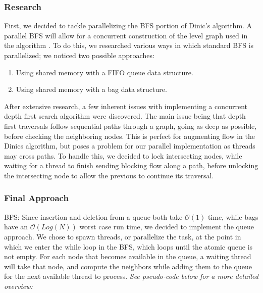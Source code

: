     \subsubsection{Research}
        First, we decided to tackle parallelizing the BFS portion of Dinic's algorithm. A parallel BFS will allow for a concurrent construction of the level graph used in the algorithm \cite{pBFS}. To do this, we researched various ways in which standard BFS is parallelized; we noticed two possible approaches:
            \begin{enumerate}
                \item Using shared memory with a FIFO queue data structure.
                \item Using shared memory with a bag data structure.
            \end{enumerate}
        After extensive research, a few inherent issues with implementing a concurrent depth first search algorithm were discovered. The main issue being that depth first traversals follow sequential paths through a graph, going as deep as possible, before checking the neighboring nodes. This is perfect for augmenting flow in the Dinics algorithm, but poses a problem for our parallel implementation as threads may cross paths. To handle this, we decided to lock intersecting nodes, while waiting for a thread to finish sending blocking flow along a path, before unlocking the intersecting node to allow the previous to continue its traversal.
    \subsubsection{Final Approach}
        BFS: Since insertion and deletion from a queue both take $\mathcal{O}(1)$ time, while bags have an $\mathcal{O}(Log(N))$ worst case run time, we decided to implement the queue approach. We chose to spawn threads, or parallelize the task, at the point in which we enter the while loop in the BFS, which loops until the atomic queue is not empty. For each node that becomes available in the queue, a waiting thread will take that node, and compute the neighbors while adding them to the queue for the next available thread to process. \emph{See pseudo-code below for a more detailed overview:}
        
